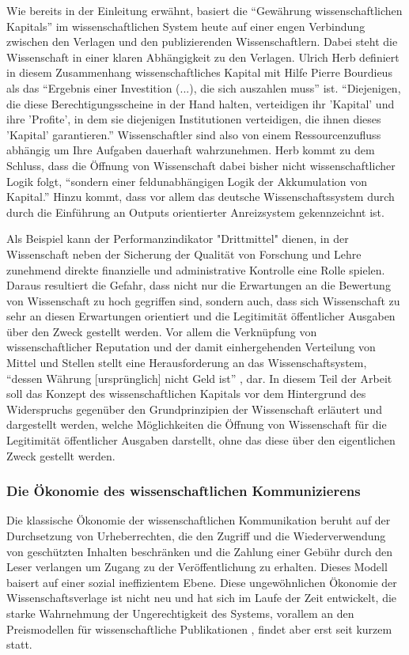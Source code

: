Wie bereits in der Einleitung erwähnt, basiert die “Gewährung wissenschaftlichen Kapitals” im wissenschaftlichen System heute auf einer engen Verbindung zwischen den Verlagen und den publizierenden Wissenschaftlern\cite{suchen}. Dabei steht die Wissenschaft in einer klaren Abhängigkeit zu den Verlagen. Ulrich Herb definiert in diesem Zusammenhang wissenschaftliches Kapital mit Hilfe Pierre Bourdieus als das “Ergebnis einer Investition (...), die sich auszahlen muss” ist. “Diejenigen, die diese Berechtigungsscheine in der Hand halten, verteidigen ihr 'Kapital' und ihre 'Profite', in dem sie diejenigen Institutionen verteidigen, die ihnen dieses 'Kapital' garantieren.”\cite{suchen} Wissenschaftler sind also von einem Ressourcenzufluss abhängig um Ihre Aufgaben dauerhaft wahrzunehmen\cite{suchen}. Herb kommt zu dem Schluss, dass die Öffnung von Wissenschaft dabei bisher nicht wissenschaftlicher Logik folgt, “sondern einer feldunabhängigen Logik der Akkumulation von Kapital.”\cite{suchen} Hinzu kommt, dass vor allem das deutsche Wissenschaftssystem durch durch die Einführung an Outputs orientierter Anreizsystem gekennzeichnt ist.\cite{osterloh2008anreize}

Als Beispiel kann der Performanzindikator "Drittmittel" dienen, in der Wissenschaft neben der Sicherung der Qualität von Forschung und Lehre zunehmend direkte finanzielle und administrative Kontrolle eine Rolle spielen\cite{suchen}. Daraus resultiert die Gefahr, dass nicht nur die Erwartungen an die Bewertung von Wissenschaft zu hoch gegriffen sind, sondern auch, dass sich Wissenschaft zu sehr an diesen Erwartungen orientiert und die Legitimität öffentlicher Ausgaben über den Zweck gestellt werden. Vor allem die Verknüpfung von  wissenschaftlicher Reputation und der damit einhergehenden Verteilung von Mittel und Stellen stellt eine Herausforderung an das Wissenschaftsystem, “dessen Währung [ursprünglich] nicht Geld ist” , dar. In diesem Teil der Arbeit soll das Konzept des wissenschaftlichen Kapitals vor dem Hintergrund des Widerspruchs gegenüber den Grundprinzipien der Wissenschaft erläutert und dargestellt werden, welche Möglichkeiten die Öffnung von Wissenschaft für die Legitimität öffentlicher Ausgaben darstellt, ohne das diese über den eigentlichen Zweck gestellt werden.
\subsubsection{Die Ökonomie des wissenschaftlichen Kommunizierens}
Die klassische Ökonomie der wissenschaftlichen Kommunikation beruht auf der Durchsetzung von Urheberrechten, die den Zugriff und die Wiederverwendung von geschützten Inhalten beschränken und die Zahlung einer Gebühr durch den Leser verlangen um Zugang zu der Veröffentlichung zu erhalten.  Dieses Modell baisert auf einer sozial ineffizientem Ebene.  Diese ungewöhnlichen Ökonomie der Wissenschaftsverlage ist nicht neu und hat sich im Laufe der Zeit entwickelt, die starke Wahrnehmung der Ungerechtigkeit des Systems, vorallem an den Preismodellen für  wissenschaftliche Publikationen , findet aber erst seit kurzem statt.  

